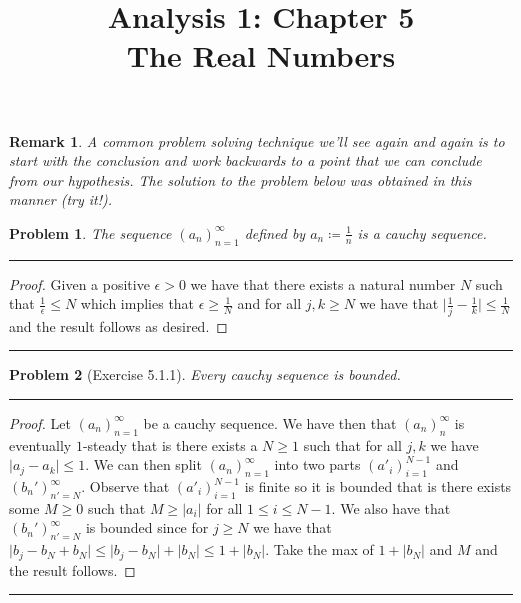 \documentclass{article}
\title{\huge Analysis 1: Chapter 5 \\ \LARGE {The Real Numbers}}
\date{}
\newcommand{\lined}{\noindent\rule{\textwidth}{1pt}}
\newtheorem*{problem}{Problem}
\newtheorem*{remark}{Remark}
\begin{document}
	\maketitle
	
	\begin{remark}
		A common problem solving technique we'll see again and again is to start with the conclusion and work backwards to a point that we can conclude from our hypothesis. The solution to the problem below was obtained in this manner (try it!).
	\end{remark}
	
	\begin{problem}
		The sequence $(a_n)_{n = 1}^{\infty}$ defined by $a_n \coloneqq \frac{1}{n}$ is a cauchy sequence.
	\end{problem}
	
	\lined
		\begin{proof}
			Given a positive $\epsilon > 0$ we have that there exists a natural number $N$ such that $\frac{1}{\epsilon} \leq N$ which implies that $\epsilon \geq \frac{1}{N}$ and for all $j,k \geq N$ we have that $\lvert \frac{1}{j} - \frac{1}{k}\rvert \leq \frac{1}{N}$ and the result follows as desired.
		\end{proof}
	\lined
	
	\newpage
	
	\begin{problem}[Exercise 5.1.1]
		Every cauchy sequence is bounded.
	\end{problem}
	
	\lined
		\begin{proof}
		 Let $(a_n)_{n = 1}^{\infty}$ be a cauchy sequence. We have then that 	$(a_n)_{n}^{\infty}$ is eventually $1$-steady that is there exists 
		 a $N \geq 1$ such that for all $j,k$ we have $\lvert a_j - a_k \rvert\leq 1$. We can then split $(a_n)_{n = 1}^{\infty}$ into two parts $(a'_i)_{i = 1}^{N - 1}$ and $(b_n')_{n' = N}^{\infty}$. Observe that $(a'_i)_{i = 1}^{N - 1}$ is finite so it is bounded that is there exists some $M \geq 0$ such that $M \geq \lvert a_i \rvert$
for all $1 \leq i \leq N - 1$.  We also have that $(b_n')_{n' = N}^{\infty}$ is bounded since for $j \geq N$ we have that $\lvert b_j - b_N + b_N \rvert \leq  \lvert b_j - b_N \rvert + \lvert b_N \rvert \leq 1 + \lvert b_N \rvert$. Take the max of $1 + \lvert b_N \rvert$ and $M$ and the result follows.
		\end{proof}
	\lined
	
\end{document}
